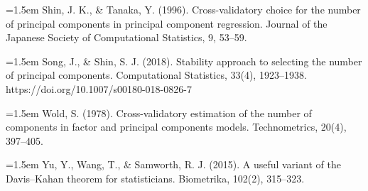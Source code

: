 \documentclass[11pt]{article}
\begin{document}
\hangindent=1.5em Shin, J. K., \& Tanaka, Y. (1996). Cross-validatory choice for the number of principal components in principal component regression. Journal of the Japanese Society of Computational Statistics, 9, 53--59.\par

\hangindent=1.5em Song, J., \& Shin, S. J. (2018). Stability approach to selecting the number of principal components. Computational Statistics, 33(4), 1923--1938. https://doi.org/10.1007/s00180-018-0826-7\par

\hangindent=1.5em Wold, S. (1978). Cross-validatory estimation of the number of components in factor and principal components models. Technometrics, 20(4), 397--405.\par

\hangindent=1.5em Yu, Y., Wang, T., \& Samworth, R. J. (2015). A useful variant of the Davis--Kahan theorem for statisticians. Biometrika, 102(2), 315--323.\par
\end{document}
